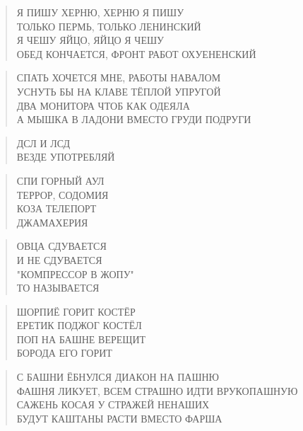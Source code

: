 \poemtitle{***}
\begin{verse}
Я ПИШУ ХЕРНЮ, ХЕРНЮ Я ПИШУ\\
ТОЛЬКО ПЕРМЬ, ТОЛЬКО ЛЕНИНСКИЙ\\
Я ЧЕШУ ЯЙЦО, ЯЙЦО Я ЧЕШУ\\
ОБЕД КОНЧАЕТСЯ, ФРОНТ РАБОТ ОХУЕНЕНСКИЙ
\end{verse}

\poemtitle{***}
\begin{verse}
СПАТЬ ХОЧЕТСЯ МНЕ, РАБОТЫ НАВАЛОМ\\
УСНУТЬ БЫ НА КЛАВЕ ТЁПЛОЙ УПРУГОЙ\\
ДВА МОНИТОРА ЧТОБ КАК ОДЕЯЛА\\
А МЫШКА В ЛАДОНИ ВМЕСТО ГРУДИ ПОДРУГИ
\end{verse}

\poemtitle{***}
\begin{verse}
ДСЛ И ЛСД\\
ВЕЗДЕ УПОТРЕБЛЯЙ
\end{verse}

\poemtitle{***}
\begin{verse}
СПИ ГОРНЫЙ АУЛ\\
ТЕРРОР, СОДОМИЯ\\
КОЗА ТЕЛЕПОРТ\\
ДЖАМАХЕРИЯ
\end{verse}

\poemtitle{***}
\begin{verse}
ОВЦА СДУВАЕТСЯ\\
И НЕ СДУВАЕТСЯ\\
"КОМПРЕССОР В ЖОПУ"\\
ТО НАЗЫВАЕТСЯ
\end{verse}

\poemtitle{***}
\begin{verse}
ШОРПИЁ ГОРИТ КОСТЁР\\
ЕРЕТИК ПОДЖОГ КОСТЁЛ\\
ПОП НА БАШНЕ ВЕРЕЩИТ\\
БОРОДА ЕГО ГОРИТ
\end{verse}

\poemtitle{***}
\begin{verse}
С БАШНИ ЁБНУЛСЯ ДИАКОН НА ПАШНЮ\\
ФАШНЯ ЛИКУЕТ, ВСЕМ СТРАШНО ИДТИ ВРУКОПАШНУЮ\\
САЖЕНЬ КОСАЯ У СТРАЖЕЙ НЕНАШИХ\\
БУДУТ КАШТАНЫ РАСТИ ВМЕСТО ФАРША
\end{verse}

